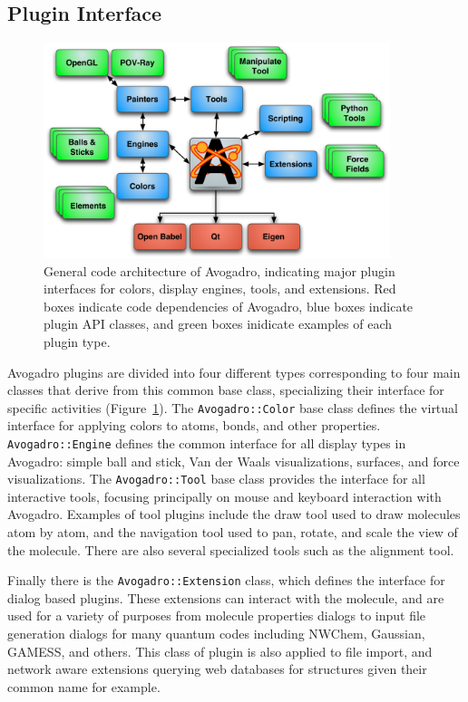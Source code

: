 \documentclass[10pt]{bmc_article}
\newenvironment{bmcformat}{\begin{raggedright}
\baselineskip20pt\sloppy\setboolean{publ}{false}}{\end{raggedright}
\baselineskip20pt\sloppy}
\begin{document}
\begin{bmcformat}
\subsection{Plugin Interface}

\begin{figure}
  \includegraphics[width=0.9\textwidth]{images/architecture}
  \caption{General code architecture of Avogadro, indicating major
    plugin interfaces for colors, display engines, tools, and
    extensions. Red boxes indicate code dependencies of Avogadro, blue
  boxes indicate plugin API classes, and green boxes inidicate examples of
  each plugin type.}
 \label{f:architecture}
\end{figure}

Avogadro plugins are divided into four different types corresponding
to four main classes
that derive from this common base class, specializing
their interface for specific activities
(Figure~\ref{f:architecture}). The {\tt Avogadro::Color} base class
defines the virtual interface for applying colors to atoms, bonds, and other properties.
 {\tt Avogadro::Engine} defines the common interface for all display types in Avogadro:
simple ball and stick, Van der Waals visualizations,
surfaces, and force visualizations. The {\tt Avogadro::Tool} base class provides
the interface for all interactive tools, focusing principally on mouse and
keyboard interaction with Avogadro. Examples of tool plugins include the draw
tool used to draw molecules atom by atom, and the navigation tool used to pan,
rotate, and scale the view of the molecule. There are also several specialized
tools such as the alignment tool.

Finally there is the {\tt Avogadro::Extension} class, which defines the interface for
dialog based plugins. These extensions can interact with the molecule, and are
used for a variety of purposes from molecule properties dialogs to input file
generation dialogs for many quantum codes including NWChem, Gaussian, GAMESS, and
others. This class of plugin is also applied to file import, and network aware
extensions querying web databases for structures given their common name for
example.


\end{bmcformat}
\end{document}

